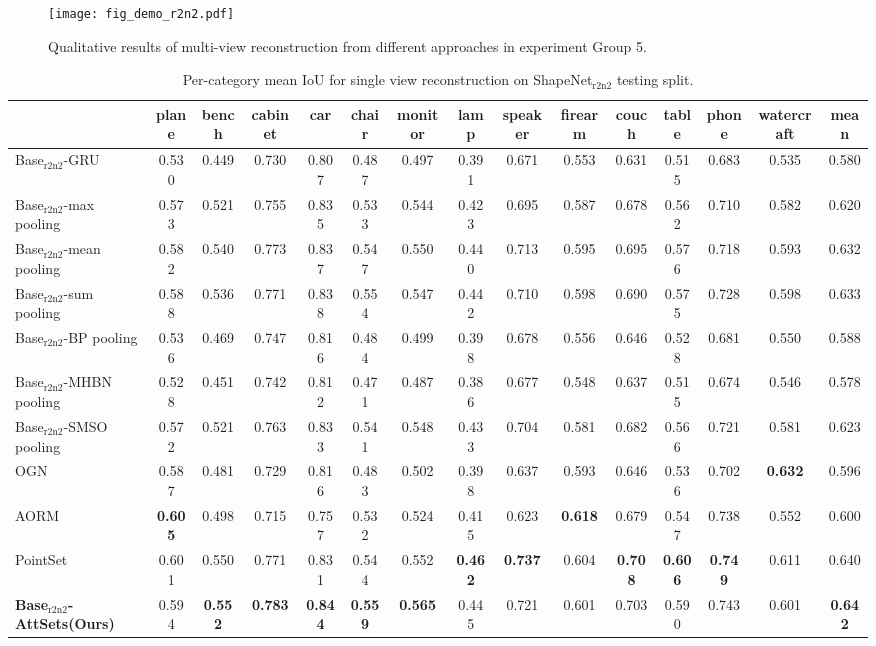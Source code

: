 \documentclass[twocolumn]{svjour3}    \pdfoutput=1
\newcommand{\nickname}{AttSets}
\begin{document}
\begin{figure*}[t]
\centering
   \texttt{[image: fig\_demo\_r2n2.pdf]}
\caption{Qualitative results of multi-view reconstruction from different approaches in experiment Group 5.}
\label{fig:mv_demo_r2n2}
\vspace{-0.35cm}
\end{figure*}
\begin{table*}[t]
\caption{ Per-category mean IoU for single view reconstruction on ShapeNet$_{\textrm{r2n2}}$ testing split.}
\centering
\label{tab:iou_r2n2_1v}
\tabcolsep=0.02cm
\begin{tabular}{ l|cccccccccccccc}
\hline
&plane&bench&cabinet&car&chair&monitor&lamp&speaker&firearm&couch&table&phone&watercraft&mean \\
\hline
Base$_{\textrm{r2n2}}$-GRU &0.530&0.449&0.730&0.807&0.487&0.497&0.391&0.671&0.553&0.631&0.515&0.683&0.535&0.580\\
Base$_{\textrm{r2n2}}$-max pooling &0.573&0.521&0.755&0.835&0.533&0.544&0.423&0.695&0.587&0.678&0.562&0.710&0.582&0.620\\
Base$_{\textrm{r2n2}}$-mean pooling &0.582&0.540&0.773&0.837&0.547&0.550&0.440&0.713&0.595&0.695&0.576&0.718&0.593&0.632\\
Base$_{\textrm{r2n2}}$-sum pooling &0.588&0.536&0.771&0.838&0.554&0.547&0.442&0.710&0.598&0.690&0.575&0.728&0.598&0.633\\
Base$_{\textrm{r2n2}}$-BP pooling &0.536&0.469&0.747&0.816&0.484&0.499&0.398&0.678&0.556&0.646&0.528&0.681&0.550&0.588\\
Base$_{\textrm{r2n2}}$-MHBN pooling &0.528&0.451&0.742&0.812&0.471&0.487&0.386&0.677&0.548&0.637&0.515&0.674&0.546&0.578\\
Base$_{\textrm{r2n2}}$-SMSO pooling &0.572&0.521&0.763&0.833&0.541&0.548&0.433&0.704&0.581&0.682&0.566&0.721&0.581&0.623\\
OGN &0.587&0.481&0.729&0.816&0.483&0.502&0.398&0.637&0.593&0.646&0.536&0.702&\textbf{0.632}&0.596\\
AORM &\textbf{0.605}&0.498&0.715&0.757&0.532&0.524&0.415&0.623&\textbf{0.618}&0.679&0.547&0.738&0.552&0.600\\
PointSet &0.601&0.550&0.771&0.831&0.544&0.552&\textbf{0.462}&\textbf{0.737}&0.604&\textbf{0.708}&\textbf{0.606}&\textbf{0.749}&0.611&0.640\\
\textbf{Base$_{\textrm{r2n2}}$-\nickname{}\scriptsize{(Ours)}} &0.594&\textbf{0.552}&\textbf{0.783}&\textbf{0.844}&\textbf{0.559}&\textbf{0.565}
&0.445&0.721&0.601&0.703&0.590&0.743&0.601&\textbf{0.642}\\
\hline
\end{tabular}
\vspace{-.25 cm}
\end{table*}
\end{document}
